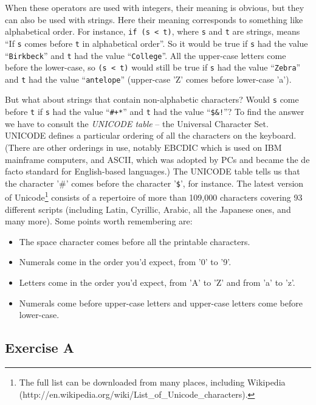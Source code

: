 When these operators are used with integers, their meaning is obvious,
but they can also be used with strings.  Here their meaning corresponds
to something like alphabetical order.  For instance, \verb!if (s < t)!,
where  \verb!s! and \verb!t! are strings, means ``If  \verb!s! comes before \verb!t!
in alphabetical order''.  So it would be true if  \verb!s! had the value
``\verb!Birkbeck!'' and \verb!t! had the value ``\verb!College!''.  All the
upper-case letters come before the lower-case, so \verb!(s < t)! would
still be true if  \verb!s! had the value ``\verb!Zebra!'' and \verb!t! had the
value ``\verb!antelope!'' (upper-case 'Z' comes before lower-case 'a').

But what about strings that contain non-alphabetic characters?  Would
\verb!s!  come before \verb!t! if \verb!s! had the value ``\verb!#+*!''
and \verb!t! had the value ``\verb+$&!+''?  To find the answer we have
to consult the \emph{UNICODE table} -- the Universal Character Set.
UNICODE defines a particular ordering of all the characters on the
keyboard.  (There are other orderings in use, notably EBCDIC which is
used on IBM mainframe computers, and ASCII, which was adopted by PCs and
became the de facto standard for English-based languages.)
The UNICODE table tells us that the character '\#' comes before the
character '\verb!$!', for instance.  The latest version of Unicode\footnote{The full list can be downloaded from many
places, including Wikipedia
(http://en.wikipedia.org/wiki/List\_of\_Unicode\_characters).}
consists of a repertoire of more than 109,000 characters covering 93
different scripts (including Latin, Cyrillic, Arabic, all the Japanese
ones, and many more). Some points worth remembering are:

\begin{itemize}
\item
The space character comes before all the printable characters.
\item
Numerals come in the order you'd expect, from '0' to '9'.
\item
Letters come in the order you'd expect, from 'A' to 'Z' and from 'a' to 'z'.
\item
Numerals come before upper-case letters and upper-case letters come before lower-case.
\end{itemize}

\subsection*{Exercise A}

